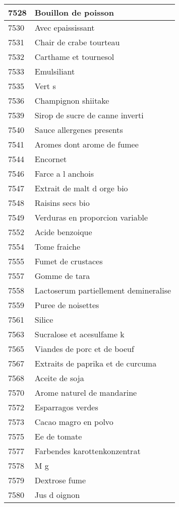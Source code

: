 \begin{longtable}{|l|l|}
7528 & Bouillon de poisson \\ \hline 
7530 & Avec epaississant \\ \hline 
7531 & Chair de crabe tourteau \\ \hline 
7532 & Carthame et tournesol \\ \hline 
7533 & Emulsiliant \\ \hline 
7535 & Vert s \\ \hline 
7536 & Champignon shiitake \\ \hline 
7539 & Sirop de sucre de canne inverti \\ \hline 
7540 & Sauce allergenes presents \\ \hline 
7541 & Aromes dont arome de fumee \\ \hline 
7544 & Encornet \\ \hline 
7546 & Farce a l anchois \\ \hline 
7547 & Extrait de malt d orge bio \\ \hline 
7548 & Raisins secs bio \\ \hline 
7549 & Verduras en proporcion variable \\ \hline 
7552 & Acide benzoique \\ \hline 
7554 & Tome fraiche \\ \hline 
7555 & Fumet de crustaces \\ \hline 
7557 & Gomme de tara \\ \hline 
7558 & Lactoserum partiellement demineralise \\ \hline 
7559 & Puree de noisettes \\ \hline 
7561 & Silice \\ \hline 
7563 & Sucralose et acesulfame k \\ \hline 
7565 & Viandes de porc et de boeuf \\ \hline 
7567 & Extraits de paprika et de curcuma \\ \hline 
7568 & Aceite de soja \\ \hline 
7570 & Arome naturel de mandarine \\ \hline 
7572 & Esparragos verdes \\ \hline 
7573 & Cacao magro en polvo \\ \hline 
7575 & Ee de tomate \\ \hline 
7577 & Farbendes karottenkonzentrat \\ \hline 
7578 & M g \\ \hline 
7579 & Dextrose fume \\ \hline 
7580 & Jus d oignon \\ \hline 

\end{longtable}
